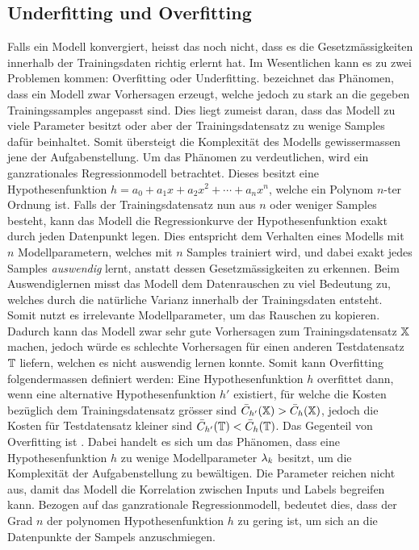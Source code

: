 \subsection{Underfitting und Overfitting}\label{sec:overfitting}
Falls ein Modell konvergiert, heisst das noch nicht, dass es die
Gesetzmässigkeiten innerhalb der Trainingsdaten richtig erlernt hat.
Im Wesentlichen kann es zu zwei Problemen kommen: Overfitting oder Underfitting.
\para{}
 bezeichnet das Phänomen, dass ein Modell zwar Vorhersagen
erzeugt, welche jedoch zu stark an die gegeben Trainingssamples angepasst sind.
Dies liegt zumeist daran, dass das Modell zu viele Parameter besitzt oder
aber der Trainingsdatensatz zu wenige Samples dafür beinhaltet.
Somit übersteigt die Komplexität des Modells gewissermassen jene der Aufgabenstellung.
\para{}
Um das Phänomen zu verdeutlichen, wird ein ganzrationales Regressionmodell betrachtet.
Dieses besitzt eine Hypothesenfunktion $h = a_0 + a_1 x + a_2 x^2 + \cdots + a_n
x^n$, welche ein Polynom $n$-ter Ordnung ist. Falls der
Trainingsdatensatz nun aus $n$ oder weniger Samples besteht, kann das Modell die
Regressionkurve der Hypothesenfunktion exakt durch jeden Datenpunkt legen.
Dies entspricht dem Verhalten eines Modells mit $n$ Modellparametern, welches
mit $n$ Samples trainiert wird, und dabei exakt jedes Samples \textit{auswendig} lernt, anstatt
dessen Gesetzmässigkeiten zu erkennen.
\para{}
Beim Auswendiglernen misst das Modell dem Datenrauschen zu viel Bedeutung zu, welches durch die natürliche Varianz
innerhalb der Trainingsdaten entsteht. Somit nutzt es
irrelevante Modellparameter, um das Rauschen zu kopieren.
Dadurch kann das Modell zwar sehr gute Vorhersagen zum Trainingsdatensatz
$\mathbb{X}$ machen, jedoch würde es schlechte Vorhersagen für einen
anderen Testdatensatz $\mathbb{T}$ liefern, welchen es nicht auswendig lernen konnte.
\para{}
Somit kann Overfitting folgendermassen definiert werden: Eine
Hypothesenfunktion $h$ overfittet dann, wenn eine alternative Hypothesenfunktion
$h'$ existiert, für welche die Kosten bezüglich dem Trainingsdatensatz
grösser sind $\bar{C}_{h'}(\mathbb{X}) > \bar{C}_h(\mathbb{X})$, jedoch die Kosten
für Testdatensatz kleiner sind $\bar{C}_{h'}(\mathbb{T}) < \bar{C}_h(\mathbb{T})$.
\para{}
Das Gegenteil von Overfitting ist . Dabei handelt es sich um das Phänomen, dass eine
Hypothesenfunktion $h$ zu
wenige Modellparameter $\lambda_k$ besitzt, um die Komplexität der Aufgabenstellung zu bewältigen.
Die Parameter reichen nicht aus, damit das Modell die Korrelation zwischen
Inputs und Labels begreifen kann.
\para{}
Bezogen auf das ganzrationale Regressionmodell, bedeutet dies, dass der Grad $n$ der
polynomen Hypothesenfunktion $h$ zu gering ist, um sich an die Datenpunkte der
Sampels anzuschmiegen.

